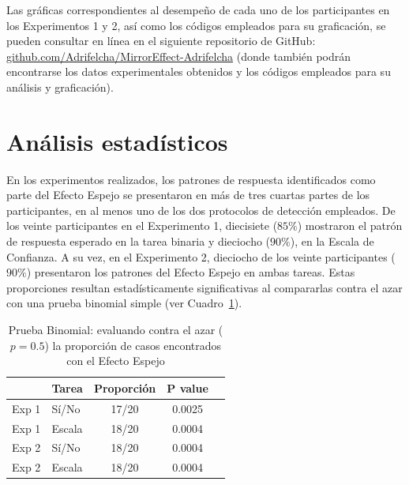 Las gráficas correspondientes al desempeño de cada uno de los participantes en los Experimentos 1 y 2, así como los códigos empleados para su graficación, se pueden consultar en línea en el siguiente repositorio de GitHub: \href{http://github.com/Adrifelcha/MirrorEffect-Adrifelcha}{github.com/Adrifelcha/MirrorEffect-Adrifelcha} (donde también podrán encontrarse los datos experimentales obtenidos y los códigos empleados para su análisis y graficación).




































\section{Análisis estadísticos}

En los experimentos realizados, los patrones de respuesta identificados como parte del Efecto Espejo se presentaron en más de tres cuartas partes de los participantes, en al menos uno de los dos protocolos de detección empleados. De los veinte participantes en el Experimento 1, diecisiete ($85\%$) mostraron el patrón de respuesta esperado en la tarea binaria y dieciocho ($90\%$), en la Escala de Confianza. A su vez, en el Experimento 2, dieciocho de los veinte participantes ($90\%$) presentaron los patrones del Efecto Espejo en ambas tareas. Estas proporciones resultan estadísticamente significativas al compararlas contra el azar con una prueba binomial simple (ver Cuadro~\ref{Cuadro_Binom}).\\

\begin{table}[h]
\caption[Prueba Binomial frecuentista: evaluando contra el azar la proporción de casos encontrados con el Efecto Espejo]{Prueba Binomial: evaluando contra el azar ($p=0.5$) la proporción de casos encontrados con el Efecto Espejo}
\label{Cuadro_Binom}
\centering
\begin{tabular}{l l | c c c}
\toprule
\textbf{} & \textbf{Tarea} & \textbf{Proporción} & \textbf{P value}\\
\midrule
Exp 1 & Sí/No & 17/20 & 0.0025 \\
Exp 1 & Escala & 18/20 & 0.0004\\
Exp 2 & Sí/No & 18/20 & 0.0004\\
Exp 2 & Escala & 18/20 & 0.0004\\
\bottomrule
\end{tabular}
\end{table}


